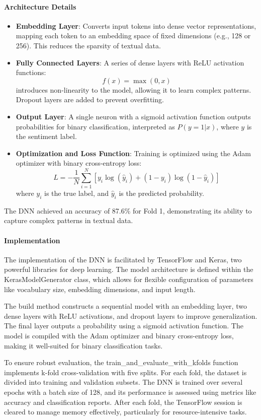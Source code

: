 \documentclass{article}
\begin{document}
\paragraph{Architecture Details}
\begin{itemize}
    \item \textbf{Embedding Layer}: Converts input tokens into dense vector representations, mapping each token to an embedding space of fixed dimensions (e.g., 128 or 256). This reduces the sparsity of textual data.
    \item \textbf{Fully Connected Layers}: A series of dense layers with ReLU activation functions:
    \[
    f(x) = \max(0, x)
    \]
    introduces non-linearity to the model, allowing it to learn complex patterns. Dropout layers are added to prevent overfitting.
    \item \textbf{Output Layer}: A single neuron with a sigmoid activation function outputs probabilities for binary classification, interpreted as \(P(y=1|x)\), where \(y\) is the sentiment label.
    \item \textbf{Optimization and Loss Function}: Training is optimized using the Adam optimizer with binary cross-entropy loss:
    \[
    L = - \frac{1}{N} \sum_{i=1}^{N} \left[ y_i \log(\hat{y}_i) + (1 - y_i) \log(1 - \hat{y}_i) \right]
    \]
    where \(y_i\) is the true label, and \(\hat{y}_i\) is the predicted probability.
\end{itemize}
The DNN achieved an accuracy of 87.6\% for Fold 1, demonstrating its ability to capture complex patterns in textual data.

\paragraph{Implementation}
The implementation of the DNN is facilitated by TensorFlow and Keras, two powerful libraries for deep learning. The model architecture is defined within the KerasModelGenerator class, which allows for flexible configuration of parameters like vocabulary size, embedding dimensions, and input length.

The build method constructs a sequential model with an embedding layer, two dense layers with ReLU activations, and dropout layers to improve generalization. The final layer outputs a probability using a sigmoid activation function. The model is compiled with the Adam optimizer and binary cross-entropy loss, making it well-suited for binary classification tasks.

To ensure robust evaluation, the train\_and\_evaluate\_with\_kfolds function implements k-fold cross-validation with five splits. For each fold, the dataset is divided into training and validation subsets. The DNN is trained over several epochs with a batch size of 128, and its performance is assessed using metrics like accuracy and classification reports. After each fold, the TensorFlow session is cleared to manage memory effectively, particularly for resource-intensive tasks.
\end{document}
